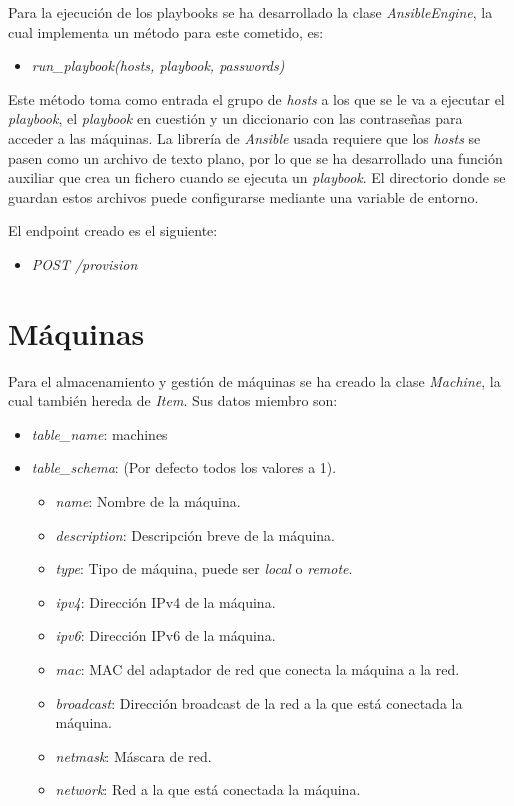 \bigskip
Para la ejecución de los playbooks se ha desarrollado la clase \textit{AnsibleEngine}, la cual implementa un método para este cometido, es:
\begin{itemize}
	\item \textit{run\_playbook(hosts, playbook, passwords)}
\end{itemize}

\bigskip
Este método toma como entrada el grupo de \textit{hosts} a los que se le va a ejecutar el \textit{playbook}, el \textit{playbook} en cuestión y un diccionario con las contraseñas para acceder a las máquinas. La librería de \textit{Ansible} usada requiere que los \textit{hosts} se pasen como un archivo de texto plano, por lo que se ha desarrollado una función auxiliar que crea un fichero cuando se ejecuta un \textit{playbook}. El directorio donde se guardan estos archivos puede configurarse mediante una variable de entorno.



\bigskip
El endpoint creado es el siguiente:
\begin{itemize}
	\item \textit{POST /provision}
\end{itemize}




\section{Máquinas}

Para el almacenamiento y gestión de máquinas se ha creado la clase \textit{Machine}, la cual también hereda de \textit{Item}. Sus datos miembro son:
\begin{itemize}
	\item \textit{table\_name}: machines
	\item \textit{table\_schema}: (Por defecto todos los valores a 1).
	\begin{itemize}
		\item \textit{name}: Nombre de la máquina.
		\item \textit{description}: Descripción breve de la máquina.
		\item \textit{type}: Tipo de máquina, puede ser \textit{local} o \textit{remote}.
		\item \textit{ipv4}: Dirección IPv4 de la máquina.
		\item \textit{ipv6}: Dirección IPv6 de la máquina.
		\item \textit{mac}: MAC del adaptador de red que conecta la máquina a la red.
		\item \textit{broadcast}: Dirección broadcast de la red a la que está conectada la máquina.
		\item \textit{netmask}: Máscara de red.
		\item \textit{network}: Red a la que está conectada la máquina.
	\end{itemize}
\end{itemize}


